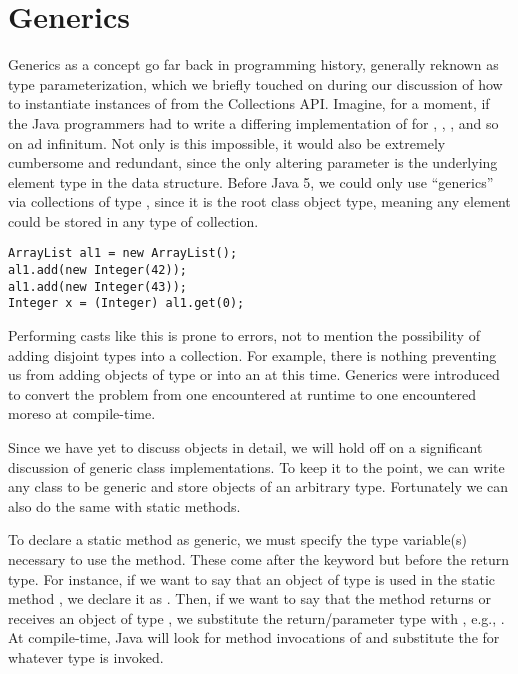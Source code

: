 \section{Generics}

Generics as a concept go far back in programming history, generally reknown as type parameterization, which we briefly touched on during our discussion of how to instantiate instances of  from the Collections API. Imagine, for a moment, if the Java programmers had to write a differing implementation of  for , , , and so on ad infinitum. Not only is this impossible, it would also be extremely cumbersome and redundant, since the only altering parameter is the underlying element type in the data structure. Before Java 5, we could only use ``generics'' via collections of type , since it is the root class object type, meaning any element could be stored in any type of collection.

\par{\footnotesize
\begin{verbatim}
ArrayList al1 = new ArrayList();
al1.add(new Integer(42));
al1.add(new Integer(43));
Integer x = (Integer) al1.get(0);
\end{verbatim}
}

Performing casts like this is prone to errors, not to mention the possibility of adding disjoint types into a collection. For example, there is nothing preventing us from adding objects of type  or  into an  at this time. Generics were introduced to convert the problem from one encountered at runtime to one encountered moreso at compile-time. 

Since we have yet to discuss objects in detail, we will hold off on a significant discussion of generic class implementations. To keep it to the point, we can write any class to be generic and store objects of an arbitrary type. Fortunately we can also do the same with static methods. 

To declare a static method as generic, we must specify the type variable(s) necessary to use the method. These come after the  keyword but before the return type. For instance, if we want to say that an object of type  is used in the static method , we declare it as . Then, if we want to say that the method returns or receives an object of type , we substitute the return/parameter type with , e.g., . At compile-time, Java will look for method invocations of  and substitute the  for whatever type  is invoked. 

